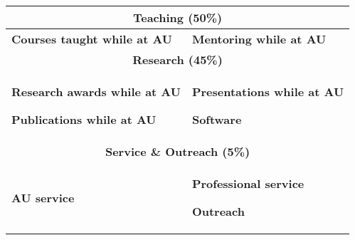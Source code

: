 {\footnotesize\sffamily
\begin{tabular}{ @{} p{3.25in}@{\hskip 3mm}p{3.25in} @{} }
    \hline
    \multicolumn{2}{c}{\textbf{Teaching (50\%)}} \\
    \hline
    \textbf{Courses taught while at AU}
    
    &
    \textbf{Mentoring while at AU}
    
    \\
    \hline
    \multicolumn{2}{c}{\textbf{Research (45\%)}} \\
    \hline
    \textbf{Research awards while at AU}
    
    \textbf{Publications while at AU}
    
    &
    \textbf{Presentations while at AU}
    
    \textbf{Software}
    
    \\
    \hline
    \multicolumn{2}{c}{\textbf{Service \& Outreach (5\%)}} \\
    \hline
    \textbf{AU service}
    
    &
    \textbf{Professional service}
    
    \textbf{Outreach}
    
    \\
    \hline
\end{tabular}
}
